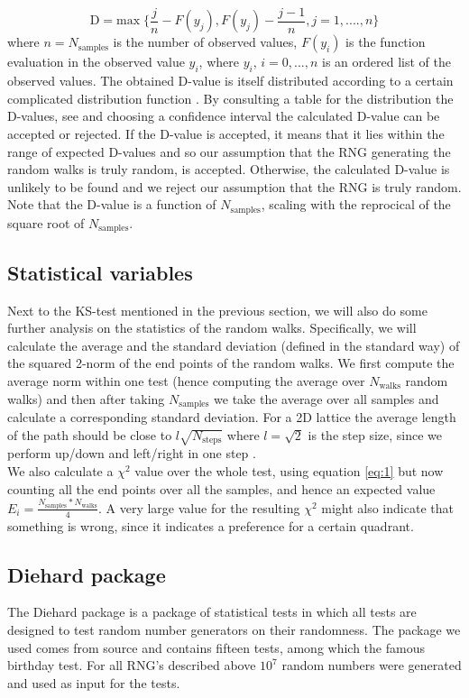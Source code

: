 \documentclass[10pt,a4paper]{article}
\begin{document}
\begin{equation}
\text{D} = \text{max} \; \{ \frac{j}{n} - F(y_{j}),F(y_{j}) - \frac{j-1}{n}, j = 1,....,n \}
\end{equation}
\noindent where $n = N_{\text{samples}}$ is the number of observed values, $F(y_{i})$ is the function evaluation in the observed value $y_{i}$, where $y_{i}$, $i = 0,...,n$ is an ordered list of the observed values. The obtained D-value is itself distributed according to a certain complicated distribution function \cite{kolmogorov}. By consulting a table for the distribution the D-values, see \cite{table} and choosing a confidence interval the calculated D-value can be accepted or rejected. If the D-value is accepted, it means that it lies within the range of expected D-values and so our assumption that the RNG generating the random walks is truly random, is accepted. Otherwise, the calculated D-value is unlikely to be found and we reject our assumption that the RNG is truly random. Note that the D-value is a function of $N_{\text{samples}}$, scaling with the reprocical of the square root of $N_{\text{samples}}$.

\subsection{Statistical variables}
Next to the KS-test mentioned in the previous section, we will also do some further analysis on the statistics of the random walks. Specifically, we will calculate the average and the standard deviation (defined in the standard way) of the squared 2-norm of the end points of the random walks. We first compute the average norm within one test (hence computing the average over $N_{\text{walks}}$ random walks) and then after taking $N_{\text{samples}}$ we take the average over all samples and calculate a corresponding standard deviation. For a 2D lattice the average length of the path should be close to $l \sqrt{N_{\text{steps}}}$ where $l = \sqrt{2}$ is the step size, since we perform up/down and left/right in one step \cite{book2}.\\
\noindent We also calculate a $\chi^2$ value over the whole test, using equation \ref{eq:1} but now counting all the end points over all the samples, and hence an expected value $E_{i} = \frac{N_{\text{samples}}*N_{\text{walks}}}{4}$. A very large value for the resulting $\chi^2$ might also indicate that something is wrong, since it indicates a preference for a certain quadrant.

\subsection{Diehard package}
The Diehard package is a package of statistical tests in which all tests are designed to test random number generators on their randomness. The package we used comes from source \cite{diehard} and contains fifteen tests, among which the famous birthday test. For all RNG's described above $10^7$ random numbers were generated and used as input for the tests.
\end{document}
